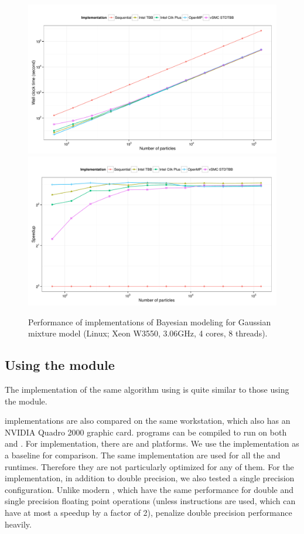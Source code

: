 \begin{figure}
  \centering
  \includegraphics[width=\linewidth]{fig/bench-smp-time-running}
  \includegraphics[width=\linewidth]{fig/bench-smp-speedup-running}
  \caption{Performance of \cpp implementations of Bayesian modeling for
    Gaussian mixture model (Linux; Xeon W3550, 3.06GHz, 4 cores, 8 threads).}
  \label{fig:bench-smp-perf}
\end{figure}

\subsection{Using the \protect\opencl module}
\label{sub:Using the OpenCL module}

The implementation of the same algorithm using \opencl is quite similar to
those using the \smp module.

\opencl implementations are also compared on the same workstation, which also
has an NVIDIA Quadro 2000 graphic card. \opencl programs can be compiled to
run on both \cpu and \gpu. For \cpu implementation, there are \iocl
\cite{iocl} and \aocl \cite{aocl} platforms. We use the \tbb implementation as
a baseline for comparison. The same \opencl implementation are used for all
the \cpu and \gpu runtimes.  Therefore they are not particularly optimized for
any of them. For the \gpu implementation, in addition to double precision, we
also tested a single precision configuration. Unlike modern \cpu, which have
the same performance for double and single precision floating point operations
(unless \simd instructions are used, which can have at most a speedup by a
factor of 2), \gpu penalize double precision performance heavily.

